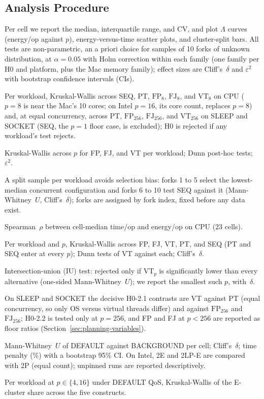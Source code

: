 \subsection{Analysis Procedure}\label{sec:planning-analysis}
Per cell we report the median, interquartile range, and CV, and plot $\Lambda$ curves (energy/op against $p$), energy-versus-time scatter plots, and cluster-split bars. All tests are non-parametric, an a priori choice for samples of 10 forks of unknown distribution, at $\alpha = 0.05$ with Holm correction within each family (one family per H0 and platform, plus the Mac memory family); effect sizes are Cliff's~$\delta$ and $\varepsilon^2$ with bootstrap confidence intervals (CIs).

\begin{planitems}
\item[\textbf{Main.}] Per workload, Kruskal-Wallis across SEQ, PT, $\mathrm{FP}_8$, $\mathrm{FJ}_8$, and $\mathrm{VT}_8$ on CPU ($p = 8$ is near the Mac's 10 cores; on Intel $p = 16$, its core count, replaces $p = 8$) and, at equal concurrency, across PT, $\mathrm{FP}_{256}$, $\mathrm{FJ}_{256}$, and $\mathrm{VT}_{256}$ on SLEEP and SOCKET (SEQ, the $p = 1$ floor case, is excluded); H0 is rejected if any workload's test rejects.
\item[\textbf{H0-1.1.}] Kruskal-Wallis across $p$ for FP, FJ, and VT per workload; Dunn post-hoc tests; $\varepsilon^2$.
\item[\textbf{H0-1.2.}] A split sample per workload avoids selection bias: forks 1 to 5 select the lowest-median concurrent configuration and forks 6 to 10 test SEQ against it (Mann-Whitney~$U$, Cliff's~$\delta$); forks are assigned by fork index, fixed before any data exist.
\item[\textbf{H0-1.3.}] Spearman~$\rho$ between cell-median time/op and energy/op on CPU (23 cells).
\item[\textbf{H0-2.1.}] Per workload and $p$, Kruskal-Wallis across FP, FJ, VT, PT, and SEQ (PT and SEQ enter at every $p$); Dunn tests of VT against each; Cliff's~$\delta$.
\item[\textbf{H0-2.2.}] Intersection-union (IU) test: rejected only if $\mathrm{VT}_p$ is significantly lower than every alternative (one-sided Mann-Whitney~$U$); we report the smallest such $p$, with~$\delta$.
\item[\textbf{Blocking.}] On SLEEP and SOCKET the decisive H0-2.1 contrasts are VT against PT (equal concurrency, so only OS versus virtual threads differ) and against $\mathrm{FP}_{256}$ and $\mathrm{FJ}_{256}$; H0-2.2 is tested only at $p = 256$, and FP and FJ at $p < 256$ are reported as floor ratios (Section~\ref{sec:planning-variables}).
\item[\textbf{H0-3.1.}] Mann-Whitney~$U$ of DEFAULT against BACKGROUND per cell; Cliff's~$\delta$; time penalty (\%) with a bootstrap 95\% CI. On Intel, 2E and 2LP-E are compared with 2P (equal count); unpinned runs are reported descriptively.
\item[\textbf{H0-3.2.}] Per workload at $p \in \{4, 16\}$ under DEFAULT QoS, Kruskal-Wallis of the E-cluster share across the five constructs.
\end{planitems}

